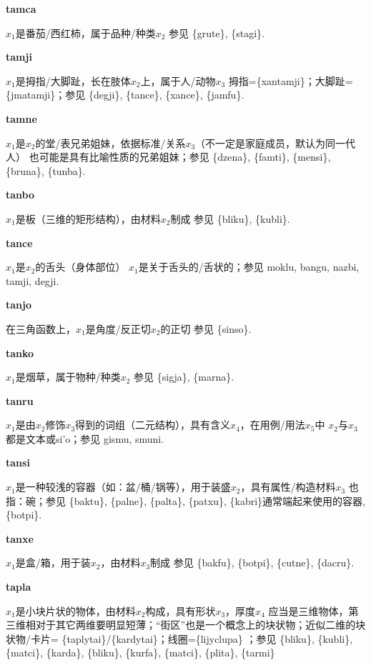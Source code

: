 \documentclass[notitlepage,twocolumn,a4paper,10pt]{book}
\begin{document}
{\sffamily\bfseries tamca} $x_1$是番茄\slash{}西红柿，属于品种\slash{}种类$x_2$ \textemdash{} 参见 \{grute\}, \{stagi\}.

{\sffamily\bfseries tamji}\enspace {\ttfamily\bfseries[taj]}  $x_1$是拇指\slash{}大脚趾，长在肢体$x_2$上，属于人\slash{}动物$x_3$ \textemdash{} 拇指=\{xantamji\}；大脚趾=\{jmatamji\}；参见 \{degji\}, \{tance\}, \{xance\}, \{jamfu\}.

{\sffamily\bfseries tamne} $x_1$是$x_2$的堂\slash{}表兄弟姐妹，依据标准\slash{}关系$x_3$（不一定是家庭成员，默认为同一代人） \textemdash{} 也可能是具有比喻性质的兄弟姐妹；参见 \{dzena\}, \{famti\}, \{mensi\}, \{bruna\}, \{tunba\}.

{\sffamily\bfseries tanbo}\enspace {\ttfamily\bfseries[        ta'o]}  $x_1$是板（三维的矩形结构），由材料$x_2$制成 \textemdash{} 参见 \{bliku\}, \{kubli\}.

{\sffamily\bfseries tance}\enspace {\ttfamily\bfseries[tac]}  $x_1$是$x_2$的舌头（身体部位） \textemdash{} $x_1$是关于舌头的\slash{}舌状的；参见 {moklu}, {bangu}, {nazbi}, {tamji}, {degji}.

{\sffamily\bfseries tanjo} 在三角函数上，$x_1$是角度\slash{}反正切$x_2$的正切 \textemdash{} 参见 \{sinso\}.

{\sffamily\bfseries tanko} $x_1$是烟草，属于物种\slash{}种类$x_2$ \textemdash{} 参见 \{sigja\}, \{marna\}.

{\sffamily\bfseries tanru}\enspace {\ttfamily\bfseries[        tau]}  $x_1$是由$x_2$修饰$x_3$得到的词组（二元结构），具有含义$x_4$，在用例\slash{}用法$x_5$中 \textemdash{} $x_2$与$x_3$都是文本或si'o；参见 {gismu}, {smuni}.

{\sffamily\bfseries tansi}\enspace {\ttfamily\bfseries[tas]}  $x_1$是一种较浅的容器（如：盆\slash{}桶\slash{}锅等），用于装盛$x_2$，具有属性\slash{}构造材料$x_3$ \textemdash{} 也指：碗；参见 \{baktu\}, \{palne\}, \{palta\}, \{patxu\}, \{kabri\}通常端起来使用的容器, \{botpi\}.

{\sffamily\bfseries tanxe}\enspace {\ttfamily\bfseries[tax     ta'e]}  $x_1$是盒\slash{}箱，用于装$x_2$，由材料$x_3$制成 \textemdash{} 参见 \{bakfu\}, \{botpi\}, \{cutne\}, \{dacru\}.

{\sffamily\bfseries tapla} $x_1$是小块片状的物体，由材料$x_2$构成，具有形状$x_3$，厚度$x_4$ \textemdash{} 应当是三维物体，第三维相对于其它两维要明显短薄；“街区”也是一个概念上的块状物；近似二维的块状物\slash{}卡片= \{taplytai\}\slash{}\{kardytai\}；线圈=\{lijyclupa\} ；参见 \{bliku\}, \{kubli\}, \{matci\}, \{karda\}, \{bliku\}, \{kurfa\}, \{matci\}, \{plita\}, \{tarmi\}
\end{document}
